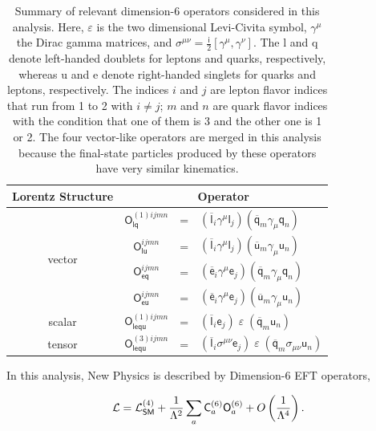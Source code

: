 \begin{table}[t]
\sffamily
\centering
\caption{Summary of relevant dimension-6 operators considered in this analysis. Here, $\varepsilon$ is the two dimensional Levi-Civita symbol, $\gamma^\mu$ the Dirac gamma matrices, and $\sigma^{\mu\nu}=\frac{\textsf{i}}{2}[\gamma^\mu,\gamma^\nu]$. The l and q denote left-handed doublets for leptons and quarks, respectively, whereas u and e denote right-handed singlets for quarks and leptons, respectively. The indices $i$ and $j$ are lepton flavor indices that run from 1 to 2 with $i \neq j$; $m$ and $n$ are quark flavor indices with the condition that one of them is 3 and the other one is 1 or 2. The four vector-like operators are merged in this analysis because the final-state particles produced by these operators have very similar kinematics.}
\begin{tabular}{cccl}
\toprule
Lorentz Structure & \multicolumn{3}{c}{Operator}\\
\midrule
\multirow{4}{*}{vector} & $\textsf{O}_{\textsf{lq}}^{(1)ijmn}$ &=& $(\overline{\textsf{l}}_i\gamma^\mu\textsf{l}_j)
 (\overline{\textsf{q}}_m\gamma_\mu\textsf{q}_n)$
 \\
 & $\textsf{O}_{\textsf{lu}}^{ijmn}$ &=& $(\overline{\textsf{l}}_i\gamma^\mu\textsf{l}_j)
 (\overline{\textsf{u}}_m\gamma_\mu\textsf{u}_n)$
 \\  
 & $\textsf{O}_{\textsf{eq}}^{ijmn}$ &=& $(\overline{\textsf{e}}_i\gamma^\mu\textsf{e}_j)
 (\overline{\textsf{q}}_m\gamma_\mu\textsf{q}_n)$
 \\ 
 & $\textsf{O}_{\textsf{eu}}^{ijmn}$ &=& $(\overline{\textsf{e}}_i\gamma^\mu\textsf{e}_j)
 (\overline{\textsf{u}}_m\gamma_\mu\textsf{u}_n)$
 \\ \midrule
\multirow{1}{*}{scalar} & $\textsf{O}_{\textsf{lequ}}^{(1)ijmn}$ &=& $(\overline{\textsf{l}}_i\textsf{e}_j)\;\varepsilon\;
 (\overline{\textsf{q}}_m\textsf{u}_n)$
 \\ 
 \multirow{1}{*}{tensor} & $\textsf{O}_{\textsf{lequ}}^{(3)ijmn}$ &=& $(\overline{\textsf{l}}_i \sigma^{\mu\nu}\textsf{e}_j)\;\varepsilon\;
 (\overline{\textsf{q}}_m\sigma_{\mu\nu}\textsf{u}_n)$
 \\ \bottomrule
\end{tabular}
\label{tab:dimension6}
\end{table}

In this analysis, New Physics is described by Dimension-6 \ac{EFT} operators,

\begin{equation}
\label{eq:0}
\mathcal{L}=\mathcal{L}_{\textsf{SM}}^{(4)} + \frac{1}{\mathrm{\Lambda}^2}\sum_{a}\textsf{C}^{(6)}_{a}\textsf{O}^{(6)}_{a}+O\left( \frac{1}{\mathrm{\Lambda}^4}\right).
\end{equation}  

